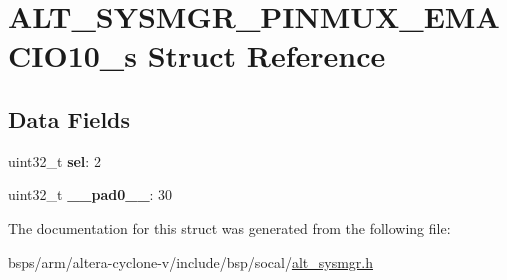 \hypertarget{structALT__SYSMGR__PINMUX__EMACIO10__s}{}\section{A\+L\+T\+\_\+\+S\+Y\+S\+M\+G\+R\+\_\+\+P\+I\+N\+M\+U\+X\+\_\+\+E\+M\+A\+C\+I\+O10\+\_\+s Struct Reference}
\label{structALT__SYSMGR__PINMUX__EMACIO10__s}
\subsection*{Data Fields}
\begin{DoxyCompactItemize}
\item 
\mbox{\label{structALT__SYSMGR__PINMUX__EMACIO10__s_a81b8663a6353bcdd0ad959df2e121b2e}} 
uint32\+\_\+t {\bfseries sel}\+: 2
\item 
\mbox{\label{structALT__SYSMGR__PINMUX__EMACIO10__s_aa28b63d05b6af97ff43e127fb980e150}} 
uint32\+\_\+t {\bfseries \+\_\+\+\_\+pad0\+\_\+\+\_\+}\+: 30
\end{DoxyCompactItemize}


The documentation for this struct was generated from the following file\+:\begin{DoxyCompactItemize}
\item 
bsps/arm/altera-\/cyclone-\/v/include/bsp/socal/\mbox{\hyperlink{alt__sysmgr_8h}{alt\+\_\+sysmgr.\+h}}\end{DoxyCompactItemize}
